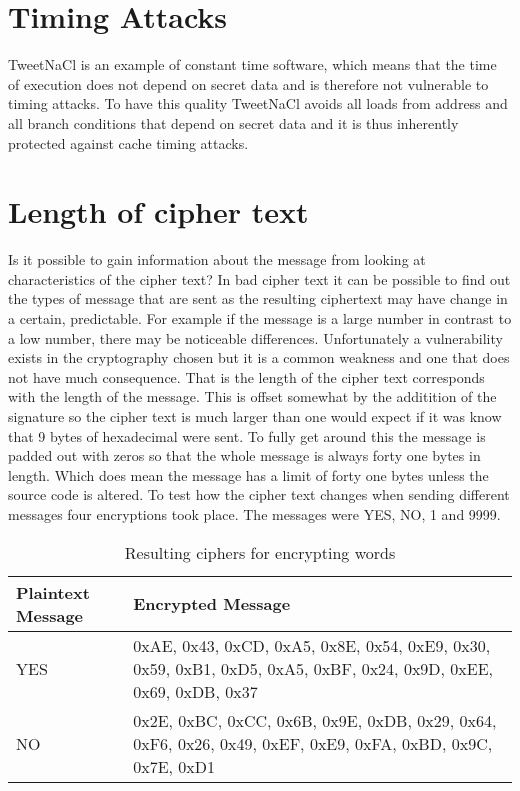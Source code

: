 \section{Timing Attacks}

TweetNaCl is an example of constant time software, which means that the time of execution does not depend on secret data and is therefore not vulnerable to timing attacks. To have this quality TweetNaCl avoids all loads from address and all branch conditions that depend on secret data and it is thus inherently protected against cache timing attacks. 

\section{Length of cipher text}

Is it possible to gain information about the message from looking at characteristics of the cipher text? In bad cipher text it can be possible to find out the types of message that are sent as the resulting ciphertext may have change in a certain, predictable. For example if the message is a large number in contrast to a low number, there may be noticeable differences. Unfortunately a vulnerability exists in the cryptography chosen but it is a common weakness and one that does not have much consequence. That is the length of the cipher text corresponds with the length of the message. This is offset somewhat by the additition of the signature so the cipher text is much larger than one would expect if it was know that 9 bytes of hexadecimal were sent. To fully get around this the message is padded out with zeros so that the whole message is always forty one bytes in length. Which does mean the message has a limit of forty one bytes unless the source code is altered. To test how the cipher text changes when sending different messages four encryptions took place. The messages were YES, NO, 1 and 9999. 

\begin{table}[H]
	\centering
	\begin{tabular}{ | l | p{7cm} | }
	\hline
	Plaintext Message & Encrypted Message \\ \hline
	YES & 0xAE, 0x43, 0xCD, 0xA5, 0x8E, 0x54, 0xE9,  0x30, 0x59, 0xB1, 0xD5, 0xA5, 0xBF, 0x24, 0x9D, 0xEE, 0x69, 0xDB, 0x37  \\ \hline
	NO &  0x2E, 0xBC, 0xCC, 0x6B, 0x9E, 0xDB, 0x29, 0x64, 0xF6, 0x26, 0x49, 0xEF, 0xE9, 0xFA, 0xBD, 0x9C, 0x7E, 0xD1 \\ \hline
	\end{tabular}
	\caption{Resulting ciphers for encrypting words}
	\label{tab:yesno}
\end{table}

